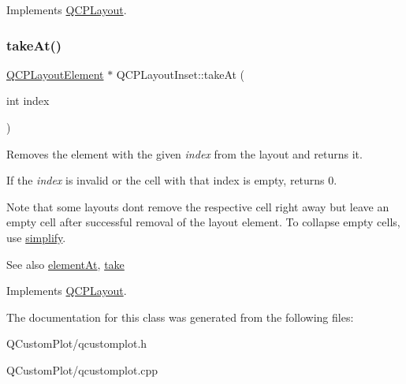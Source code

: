 Implements \mbox{\hyperlink{class_q_c_p_layout_ada26cd17e56472b0b4d7fbbc96873e4c}{Q\+C\+P\+Layout}}.

\mbox{\label{class_q_c_p_layout_inset_abf2e8233f5b7051220907e62ded490a2}} 
\subsubsection{\texorpdfstring{take\+At()}{takeAt()}}
{\footnotesize\ttfamily \mbox{\hyperlink{class_q_c_p_layout_element}{Q\+C\+P\+Layout\+Element}} $\ast$ Q\+C\+P\+Layout\+Inset\+::take\+At (\begin{DoxyParamCaption}\item[{int}]{index }\end{DoxyParamCaption})\hspace{0.3cm}{\ttfamily [virtual]}}

Removes the element with the given {\itshape index} from the layout and returns it.

If the {\itshape index} is invalid or the cell with that index is empty, returns 0.

Note that some layouts don\textquotesingle{}t remove the respective cell right away but leave an empty cell after successful removal of the layout element. To collapse empty cells, use \mbox{\hyperlink{class_q_c_p_layout_inset_a18b7d508f0baa60cc5dcb1343cf7f32a}{simplify}}.

\begin{DoxySeeAlso}{See also}
\mbox{\hyperlink{class_q_c_p_layout_inset_a881ca205605bae9c034733b808f93a02}{element\+At}}, \mbox{\hyperlink{class_q_c_p_layout_inset_af7f13cc369f8190b5e7e17d5f39dfe1c}{take}} 
\end{DoxySeeAlso}


Implements \mbox{\hyperlink{class_q_c_p_layout_a5a79621fa0a6eabb8b520cfc04fb601a}{Q\+C\+P\+Layout}}.



The documentation for this class was generated from the following files\+:\begin{DoxyCompactItemize}
\item 
Q\+Custom\+Plot/qcustomplot.\+h\item 
Q\+Custom\+Plot/qcustomplot.\+cpp\end{DoxyCompactItemize}
